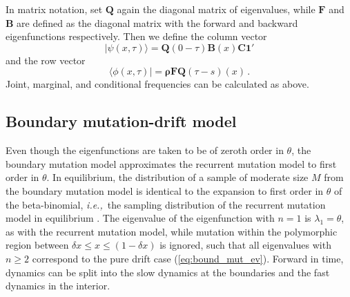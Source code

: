 \documentclass[preprint]{elsarticle}
\newcommand{\bs}[1]{\ensuremath{\boldsymbol{#1}}}
\newcommand\ie{{\it i.e.,}}
\newcommand\oneC{\ensuremath{\mathbf{1}'}}
\begin{document}
In matrix notation, set $\mathbf{Q}$ again the diagonal matrix of eigenvalues, while  $\mathbf{F}$ and $\mathbf{B}$ are defined as the diagonal matrix with the forward and  backward eigenfunctions respectively. Then we define the column vector
\begin{equation}
|\psi(x,\tau)\rangle=\mathbf{Q}(0-\tau)\mathbf{B}(x)\mathbf{C}\oneC
\end{equation}
and the row vector
\begin{equation}
\langle\phi(x,\tau)|=\bs{\rho}\mathbf{F}\mathbf{Q}(\tau-s)(x)\,.
\end{equation}
Joint, marginal, and conditional frequencies can be calculated as above. 

\subsection{Boundary mutation-drift model}

Even though the eigenfunctions are taken to be of zeroth order in $\theta$, the boundary mutation model approximates the recurrent mutation model to first order in $\theta$. In equilibrium, the distribution of a sample of moderate size $M$ from the boundary mutation model is identical to the expansion to first order in $\theta$ of the beta-binomial, \ie\ the sampling distribution of the recurrent mutation model in equilibrium \citep{Vogl15}. The eigenvalue of the eigenfunction with $n=1$ is $\lambda_1=\theta$, as with the recurrent mutation model, while mutation within the polymorphic region between $\delta x \leq x \leq (1-\delta x)$ is ignored, such that all eigenvalues with $n\geq 2$ correspond to the pure drift case (\ref{eq:bound_mut_ev}). Forward in time, dynamics can be split into the slow dynamics at the boundaries and the fast dynamics in the interior. 
\end{document}
